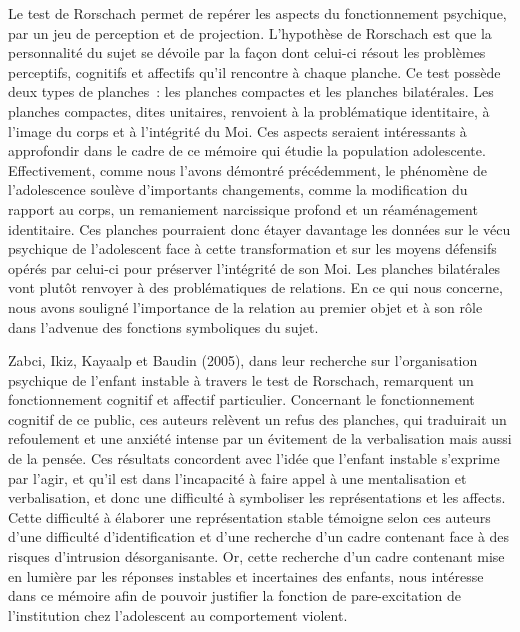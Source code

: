 \documentclass[12pt, a4paper]{book}
\begin{document}
\begin{spacing}{1.5}
Le  test de Rorschach permet de repérer les aspects du fonctionnement psychique, par un jeu de perception et de projection. L'hypothèse de Rorschach est que la personnalité du sujet se dévoile par la façon dont celui-ci résout les problèmes perceptifs, cognitifs et affectifs qu'il rencontre à chaque planche. Ce test possède deux types de planches : les planches compactes et les planches bilatérales. Les planches compactes, dites unitaires,  renvoient à la problématique identitaire, à l'image du corps et à l'intégrité du Moi. Ces aspects seraient intéressants à approfondir dans le cadre de ce mémoire qui étudie la population adolescente. Effectivement, comme nous l'avons démontré précédemment, le phénomène de l'adolescence soulève d'importants changements, comme la modification du rapport au corps, un remaniement narcissique profond et un réaménagement identitaire. Ces planches pourraient donc étayer davantage les données sur le vécu psychique de l'adolescent face à cette transformation et sur les moyens défensifs opérés par celui-ci pour préserver l'intégrité de son Moi. Les planches bilatérales vont plutôt renvoyer à des problématiques de relations. En ce qui nous concerne, nous avons souligné l'importance de la relation au premier objet  et à son rôle dans l'advenue des fonctions symboliques du sujet.

Zabci, Ikiz, Kayaalp et Baudin (2005), dans leur recherche sur l'organisation psychique de l'enfant instable à travers le test de Rorschach, remarquent un fonctionnement cognitif et affectif particulier. Concernant le  fonctionnement cognitif de ce public, ces auteurs relèvent un refus des planches, qui traduirait un refoulement et une anxiété intense par un évitement de la verbalisation mais aussi de la pensée. Ces résultats concordent avec l'idée que l'enfant instable s'exprime par l'agir, et qu'il est dans l'incapacité à faire appel à une mentalisation et verbalisation, et donc une difficulté à symboliser les représentations et les affects. Cette difficulté à élaborer une représentation stable  témoigne selon ces auteurs d'une difficulté d'identification et d'une recherche d'un cadre contenant face à des risques d'intrusion désorganisante. Or, cette recherche d'un cadre contenant mise en lumière par les réponses instables et incertaines des enfants, nous intéresse dans ce mémoire afin de  pouvoir justifier la fonction de pare-excitation de l'institution chez l'adolescent au comportement violent.


\end{spacing}
\end{document}
